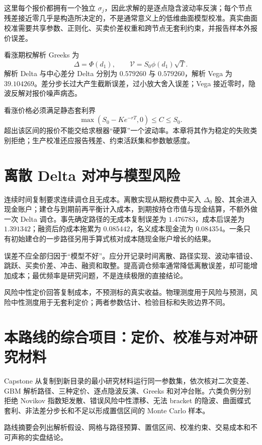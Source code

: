 这里每个报价都拥有一个独立 $\sigma_j$，因此求解的是逐点隐含波动率反演；每个节点残差接近零几乎是构造所决定的，不是通常意义上的低维曲面模型校准。真实曲面校准需要共享参数、正则化、买卖价差权重和跨节点无套利约束，并报告样本外报价误差。

看涨期权解析 Greeks 为
\[
 \Delta=\Phi(d_1),\qquad
 \mathcal V=S_0\phi(d_1)\sqrt T.
\]
解析 Delta 与中心差分 Delta 分别为 $0.579260$ 与 $0.579260$，解析 Vega 为 $39.104269$。差分步长过大产生截断误差，过小放大舍入误差；Vega 接近零时，隐波反解对报价噪声病态。

看涨价格必须满足静态套利界
\[
 \max(S_0-Ke^{-rT},0)\le C\le S_0.
\]
超出该区间的报价不能交给求根器“硬算”一个波动率。本章将其作为稳定的失败类别拒绝；生产校准还应报告残差、约束活跃集和参数敏感度。

\section{离散 Delta 对冲与模型风险}

连续时间复制要求连续调仓且无成本。离散实现从期权费中买入 $\Delta_0$ 股、其余进入现金账户；建仓与到期前再平衡计入成本，到期按持仓市值与现金结算，不额外做一次 Delta 调仓。事先确定路径的无成本复制误差为 $1.476783$，成本后误差为 $1.391342$；融资后的成本拖累为 $0.085442$，名义成本现金流为 $0.084354$。一条只有初始建仓的一步路径另用手算式核对成本随现金账户增长的结果。

误差不应全部归因于“模型不好”。应分开记录时间离散、路径实现、波动率错设、跳跃、买卖价差、冲击、融资和取整。提高调仓频率通常降低离散误差，却可能增加成本；最优频率是研究问题，不是连续极限的直接结论。

\begin{note}[研究解释]
风险中性定价回答复制成本，不预测标的真实收益。物理测度用于风险与预测，风险中性测度用于无套利定价；两者参数估计、检验目标和失败边界不同。
\end{note}

\section{本路线的综合项目：定价、校准与对冲研究材料}

Capstone 从复制到新目录的最小研究材料运行同一参数集，依次核对二次变差、GBM 解析路径、三种定价、逐点隐波反演、Greeks 和对冲台账。六类负例分别拒绝 Novikov 指数矩发散、错误风险中性漂移、无法 bracket 的隐波、曲面蝶式套利、非法差分步长和不足以形成置信区间的 Monte Carlo 样本。

路线摘要会列出解析假设、网格与路径预算、置信区间、校准约束、交易成本和不可声称的实盘结论。

